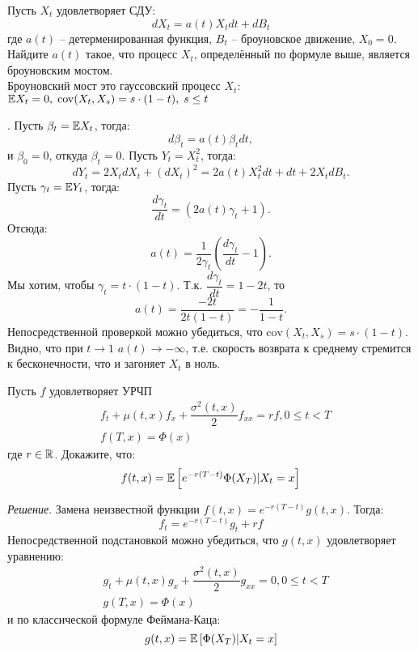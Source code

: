 \documentclass[12pt]{article}
\begin{document}
\begin{problem}
    Пусть $X_t$ удовлетворяет СДУ:    
    $$
        dX_t = a(t) X_t dt + dB_t
    $$ где $a(t)$ -- детерменированная функция, $B_t$ -- броуновское движение, $X_0 = 0$.
    Найдите $a(t)$ такое, что процесс $X_t$, определённый по формуле выше, является броуновским мостом.
    \\ Броуновский мост это гауссовский процесс $X_t$: $\mathbb{E} X_t = 0, \; \mathrm{cov}(X_t, X_s) = s\cdot (1 - t), \; s \leq t$
\end{problem}. Пусть $\beta_t = \mathbb{E} X_t$, тогда:
$$
    d\beta_t = a(t) \beta_t dt,
$$ и $\beta_0=0$, откуда $\beta_t = 0$.
Пусть $Y_t = X_t^2$, тогда:
$$
    dY_t = 2X_t dX_t + (dX_t)^2 = 2 a(t) X_t^2 dt + dt + 2X_t dB_t.
$$Пусть $\gamma_t = \mathbb{E} Y_t$, тогда:
$$
    \dfrac{d\gamma_t}{dt} = \left( 2 a(t) \gamma_t + 1\right).
$$Отсюда:
$$
    a(t) = \dfrac{1}{2\gamma_t} \left( \dfrac{d\gamma_t}{dt} - 1 \right).
$$
Мы хотим, чтобы $\gamma_t = t\cdot (1-t)$. Т.к. $\dfrac{d\gamma_t}{dt} = 1 - 2t$, то
$$
a(t) = \dfrac{-2t}{2 t (1 - t)} = -\dfrac{1}{1-t}.
$$
Непосредственной проверкой можно убедиться, что $\mathrm{cov}(X_t, X_s) = s \cdot (1-t)$.
Видно, что при $t \to 1$ $a(t)\to -\infty$, т.е. скорость возврата к среднему стремится к бесконечности, что и загоняет $X_t$ в ноль.

\begin{problem}
    Пусть $f$ удовлетворяет УРЧП
    \begin{align*}
        &f_t + \mu(t, x) f_x + \dfrac{\sigma^2(t, x)}{2} f_{xx} = rf, 0 \leq t < T \\
        &f(T, x) = \Phi(x)
    \end{align*}
    где $r \in \mathbb{R}$. Докажите, что:
    $$
        f(t, x) = \mathbb{E} \left[ e^{-r(T-t)} \Phi(X_T) | X_t = x\right]
    $$
\end{problem}
\textit{Решение}. Замена неизвестной функции $f(t, x) = e^{-r(T-t)} g(t, x)$. Тогда:
$$
    f_t = e^{-r(T-t)} g_t + r f
$$Непосредственной подстановкой можно убедиться, что $g(t, x)$ удовлетворяет уравнению:
\begin{align*}
    &g_t + \mu(t, x) g_x + \dfrac{\sigma^2(t, x)}{2} g_{xx} = 0, 0 \leq t < T \\
    &g(T, x) = \Phi(x)
\end{align*} и по классической формуле Феймана-Каца: 
$$
    g(t, x) = \mathbb{E} \left[ \Phi(X_T) | X_t = x\right]
$$
\end{document}
